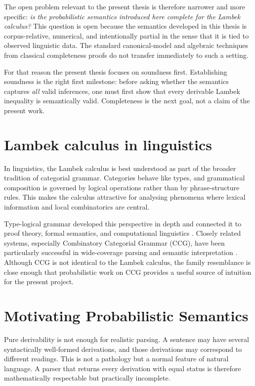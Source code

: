 The open problem relevant to the present thesis is therefore narrower and more specific:
\emph{is the probabilistic semantics introduced here complete for the Lambek calculus?} This
question is open because the semantics developed in this thesis is corpus-relative, numerical,
and intentionally partial in the sense that it is tied to observed linguistic data. The standard
canonical-model and algebraic techniques from classical completeness proofs do not transfer
immediately to such a setting.

For that reason the present thesis focuses on soundness first. Establishing soundness is the right
first milestone: before asking whether the semantics captures \emph{all} valid inferences, one
must first show that every derivable Lambek inequality is semantically valid. Completeness is the
next goal, not a claim of the present work.


\section{Lambek calculus in linguistics}
In linguistics, the Lambek calculus is best understood as part of the broader tradition of
categorial grammar. Categories behave like types, and grammatical composition is governed by
logical operations rather than by phrase-structure rules. This makes the calculus attractive for
analysing phenomena where lexical information and local combinatorics are central.

Type-logical grammar developed this perspective in depth and connected it to proof theory,
formal semantics, and computational linguistics \citep{Moortgat1997,Morrill1994}. Closely related
systems, especially Combinatory Categorial Grammar (CCG), have been particularly successful in
wide-coverage parsing and semantic interpretation \citep{Steedman2000,ClarkCurran2007}.
Although CCG is not identical to the Lambek calculus, the family resemblance is close enough
that probabilistic work on CCG provides a useful source of intuition for the present project.


\section{Motivating Probabilistic Semantics}
Pure derivability is not enough for realistic parsing. A sentence may have several syntactically
well-formed derivations, and those derivations may correspond to different readings. This is not a
pathology but a normal feature of natural language. A parser that returns every derivation with
equal status is therefore mathematically respectable but practically incomplete.


